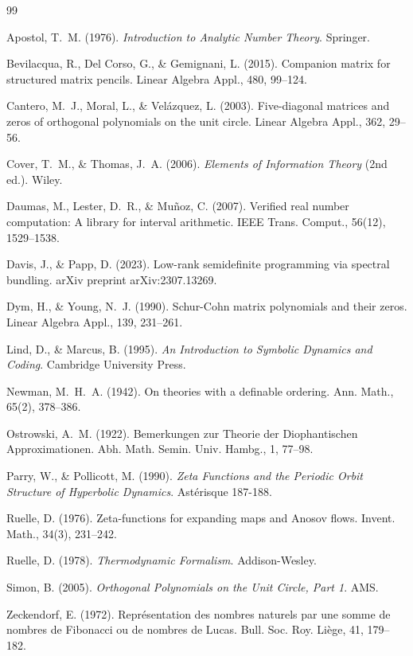 \begin{thebibliography}{99}

 Apostol, T.~M. (1976). \emph{Introduction to Analytic Number Theory}. Springer.

 Bevilacqua, R., Del Corso, G., \& Gemignani, L. (2015). Companion matrix for structured matrix pencils. Linear Algebra Appl., 480, 99–124.

 Cantero, M.~J., Moral, L., \& Velázquez, L. (2003). Five-diagonal matrices and zeros of orthogonal polynomials on the unit circle. Linear Algebra Appl., 362, 29–56.

 Cover, T.~M., \& Thomas, J.~A. (2006). \emph{Elements of Information Theory} (2nd ed.). Wiley.

 Daumas, M., Lester, D.~R., \& Muñoz, C. (2007). Verified real number computation: A library for interval arithmetic. IEEE Trans. Comput., 56(12), 1529–1538.

 Davis, J., \& Papp, D. (2023). Low-rank semidefinite programming via spectral bundling. arXiv preprint arXiv:2307.13269.

 Dym, H., \& Young, N.~J. (1990). Schur-Cohn matrix polynomials and their zeros. Linear Algebra Appl., 139, 231–261.

 Lind, D., \& Marcus, B. (1995). \emph{An Introduction to Symbolic Dynamics and Coding}. Cambridge University Press.

 Newman, M.~H.~A. (1942). On theories with a definable ordering. Ann. Math., 65(2), 378–386.

 Ostrowski, A.~M. (1922). Bemerkungen zur Theorie der Diophantischen Approximationen. Abh. Math. Semin. Univ. Hambg., 1, 77–98.

 Parry, W., \& Pollicott, M. (1990). \emph{Zeta Functions and the Periodic Orbit Structure of Hyperbolic Dynamics}. Astérisque 187-188.

 Ruelle, D. (1976). Zeta-functions for expanding maps and Anosov flows. Invent. Math., 34(3), 231–242.

 Ruelle, D. (1978). \emph{Thermodynamic Formalism}. Addison-Wesley.

 Simon, B. (2005). \emph{Orthogonal Polynomials on the Unit Circle, Part 1}. AMS.

 Zeckendorf, E. (1972). Représentation des nombres naturels par une somme de nombres de Fibonacci ou de nombres de Lucas. Bull. Soc. Roy. Liège, 41, 179–182.

\end{thebibliography}
